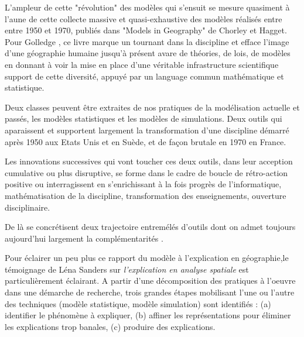 {L'ampleur de cette "révolution" des modèles qui s'ensuit \autocite{Wilson1972} \autocite{Varenne2014} se mesure quasiment à l'aune de cette collecte massive et quasi-exhaustive des modèles réalisés entre entre 1950 et 1970, publiés dans "Models in Geography" de Chorley et Hagget. Pour Golledge \autocite{Golledge2006}, ce livre marque un tournant dans la discipline et efface l'image d'une géographie humaine jusqu'à présent avare de théories, de lois, de modèles en donnant à voir la mise en place d'une véritable infrastructure scientifique support de cette diversité, appuyé par un language commun  mathématique et statistique.  %

Deux classes peuvent être extraites de nos pratiques de la modélisation actuelle et passés, les modèles statistiques et les modèles de simulations. Deux outils qui aparaissent et supportent largement la transformation d'une discipline démarré après 1950 aux Etats Unis et en Suède, et de façon brutale en 1970 \autocite[127]{Pumain2002} en France. 

Les innovations successives qui vont toucher ces deux outils, dans leur acception cumulative ou plus disruptive, se forme dans le cadre de boucle de rétro-action positive ou interragissent en s'enrichissant à la fois progrès de l'informatique, mathématisation de la discipline, transformation des enseignements, ouverture disciplinaire. 

De là se concrétisent deux trajectoire entremélés d'outils dont on admet toujours aujourd'hui largement la complémentarités \autocite{Sanders} \autocite{Manzo} \autocite{Cotinneau} \autocite{}. 

Pour éclairer un peu plus ce rapport du modèle à l'explication en géographie,le témoignage de Léna Sanders sur \textit{l'explication en analyse spatiale} \autocite{Sanders2000} est particulièrement éclairant. A partir d'une décomposition des pratiques à l'oeuvre dans une démarche de recherche, trois grandes étapes mobilisant l'une ou l'autre des techniques (modèle statistique, modèle simulation) sont identifiés : (a) identifier le phénomène à expliquer, (b) affiner les représentations pour éliminer les explications trop banales, (c) produire des explications. \autocite{Sanders2000}

}
